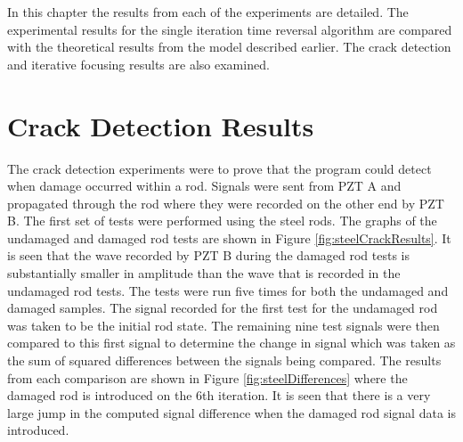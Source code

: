 
In this chapter the results from each of the experiments are detailed. The experimental results for the single iteration time reversal algorithm are compared with the theoretical results from the model described earlier. The crack detection and iterative focusing results are also examined.

\section{Crack Detection Results}
The crack detection experiments were to prove that the program could detect when damage occurred within a rod. Signals were sent from PZT A and propagated through the rod where they were recorded on the other end by PZT B. The first set of tests were performed using the steel rods. The graphs of the undamaged and damaged rod tests are shown in Figure \ref{fig:steelCrackResults}. It is seen that the wave recorded by PZT B during the damaged rod tests is substantially smaller in amplitude than the wave that is recorded in the undamaged rod tests. The tests were run five times for both the undamaged and damaged samples. The signal recorded for the first test for the undamaged rod was taken to be the initial rod state. The remaining nine test signals were then compared to this first signal to determine the change in signal which was taken as the sum of squared differences between the signals being compared. The results from each comparison are shown in Figure \ref{fig:steelDifferences} where the damaged rod is introduced on the 6th iteration. It is seen that there is a very large jump in the computed signal difference when the damaged rod signal data is introduced. 

